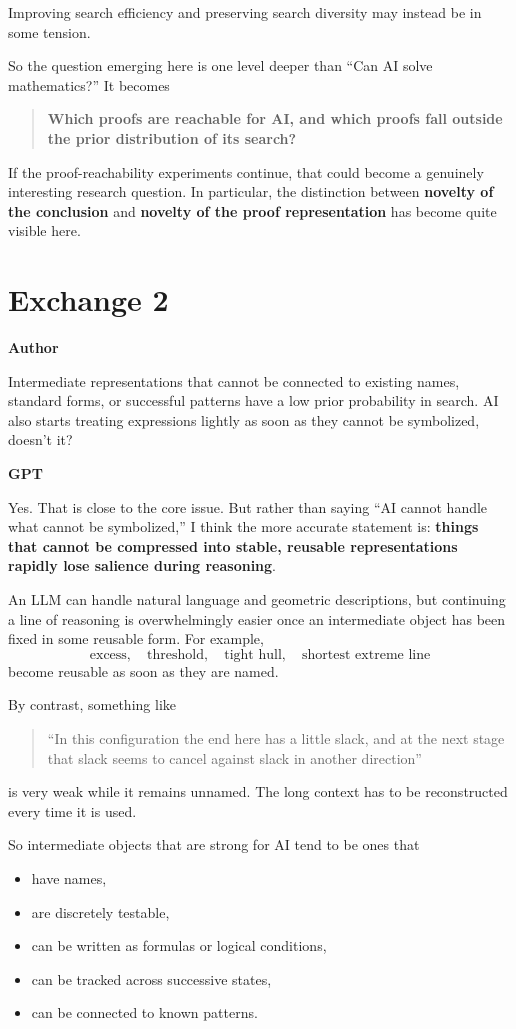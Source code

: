 \documentclass[11pt,a4paper]{article}
\newcommand{\speaker}[1]{\par\medskip\noindent\textsf{\bfseries #1}\par\smallskip}
\begin{document}
Improving search efficiency and preserving search diversity may instead be in some tension.

So the question emerging here is one level deeper than “Can AI solve mathematics?” It becomes
\begin{quote}
\textbf{Which proofs are reachable for AI, and which proofs fall outside the prior distribution of its search?}
\end{quote}

If the proof-reachability experiments continue, that could become a genuinely interesting research question. In particular, the distinction between \textbf{novelty of the conclusion} and \textbf{novelty of the proof representation} has become quite visible here.

\section*{Exchange 2}
\speaker{Author}
Intermediate representations that cannot be connected to existing names, standard forms, or successful patterns have a low prior probability in search. AI also starts treating expressions lightly as soon as they cannot be symbolized, doesn't it?

\speaker{GPT}
Yes. That is close to the core issue. But rather than saying “AI cannot handle what cannot be symbolized,” I think the more accurate statement is: \textbf{things that cannot be compressed into stable, reusable representations rapidly lose salience during reasoning}.

An LLM can handle natural language and geometric descriptions, but continuing a line of reasoning is overwhelmingly easier once an intermediate object has been fixed in some reusable form. For example,
\[
\text{excess},\quad
\text{threshold},\quad
\text{tight hull},\quad
\text{shortest extreme line}
\]
become reusable as soon as they are named.

By contrast, something like
\begin{quote}
“In this configuration the end here has a little slack, and at the next stage that slack seems to cancel against slack in another direction”
\end{quote}
is very weak while it remains unnamed. The long context has to be reconstructed every time it is used.

So intermediate objects that are strong for AI tend to be ones that
\begin{itemize}[leftmargin=2em]
\item have names,
\item are discretely testable,
\item can be written as formulas or logical conditions,
\item can be tracked across successive states,
\item can be connected to known patterns.
\end{itemize}
\end{document}
